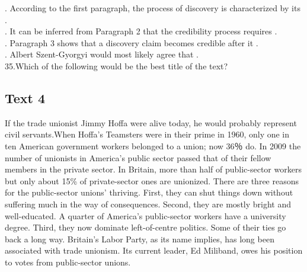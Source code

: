 \begin{questions} . According to the first paragraph, the process of discovery is characterized by its        .
   \\ . It can be inferred from Paragraph 2 that the credibility process requires         .
   \\ . Paragraph 3 shows that a discovery claim becomes credible after it         .
   \\ . Albert Szent-Gyorgyi would most likely agree that         .
   \\ \question 35.Which of the following would be the best title of the text?
   \\ \end{questions}      \subsection{Text 4}
If the trade unionist Jimmy Hoffa were alive today, he would probably represent civil servants.When Hoffa’s Teamsters were in their prime in 1960, only one in ten American government workers belonged to a union; now 36％ do. In 2009 the number of unionists in America’s public sector passed that of their fellow members in the private sector. In Britain, more than half of public-sector workers but only about 15\% of private-sector ones are unionized.
There are three reasons for the public-sector unions’ thriving. First, they can shut things down without suffering much in the way of consequences. Second, they are mostly bright and well-educated. A quarter of America’s public-sector workers have a university degree. Third, they now dominate left-of-centre politics. Some of their ties go back a long way. Britain’s Labor Party, as its name implies, has long been associated with trade unionism. Its current leader, Ed Miliband, owes his position to votes from public-sector unions.
